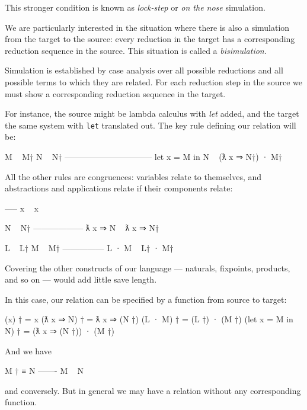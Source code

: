 This stronger condition is known as \emph{lock-step} or \emph{on the
nose} simulation.

We are particularly interested in the situation where there is also a
simulation from the target to the source: every reduction in the target
has a corresponding reduction sequence in the source. This situation is
called a \emph{bisimulation}.

Simulation is established by case analysis over all possible reductions
and all possible terms to which they are related. For each reduction
step in the source we must show a corresponding reduction sequence in
the target.

For instance, the source might be lambda calculus with \emph{let} added,
and the target the same system with \texttt{let} translated out. The key
rule defining our relation will be:

\begin{myDisplay}
M ~ M†
N ~ N†
--------------------------------
let x = M in N ~ (ƛ x ⇒ N†) · M†
\end{myDisplay}

All the other rules are congruences: variables relate to themselves, and
abstractions and applications relate if their components relate:

\begin{myDisplay}
-----
x ~ x

N ~ N†
------------------
ƛ x ⇒ N ~ ƛ x ⇒ N†

L ~ L†
M ~ M†
---------------
L · M ~ L† · M†
\end{myDisplay}

Covering the other constructs of our language --- naturals, fixpoints,
products, and so on --- would add little save length.

In this case, our relation can be specified by a function from source to
target:

\begin{myDisplay}
(x) †               =  x
(ƛ x ⇒ N) †         =  ƛ x ⇒ (N †)
(L · M) †           =  (L †) · (M †)
(let x = M in N) †  =  (ƛ x ⇒ (N †)) · (M †)
\end{myDisplay}

And we have

\begin{myDisplay}
M † ≡ N
-------
M ~ N
\end{myDisplay}

and conversely. But in general we may have a relation without any
corresponding function.

